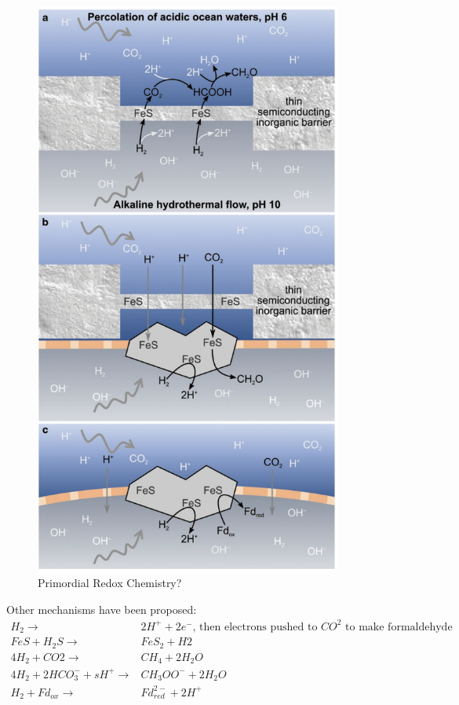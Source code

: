 \documentclass[]{article}
\begin{document}
\begin{figure}[H]
	\caption{Primordial Redox Chemistry?} \label{fig:PrimordialRedox} 
	\includegraphics[width=0.9\textwidth]{PrimordialRedox}
\end{figure}

Other mechanisms have been proposed:
\begin{align*}
H_2 \rightarrow & 2H^+ + 2 e^- \text{, then electrons pushed to $CO^2$ to make formaldehyde}\\
FeS + H_2 S \rightarrow &Fe S_2 +H2\\
4H_2 +CO2 \rightarrow & CH_4 + 2H_2 O\\
4H_2 + 2HCO^-_3 + sH^+\rightarrow & CH_3OO^- + 2H_2O\\
H_2 + Fd_{ox} \rightarrow & Fd^{2-}_{red} + 2H^+ 
\end{align*}
\end{document}
